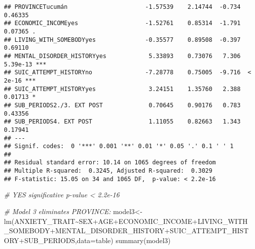 \documentclass[
]{book}
\newenvironment{Shaded}{\begin{snugshade}}{\end{snugshade}}
\newcommand{\AttributeTok}[1]{\textcolor[rgb]{0.77,0.63,0.00}{#1}}
\newcommand{\CommentTok}[1]{\textcolor[rgb]{0.56,0.35,0.01}{\textit{#1}}}
\newcommand{\FunctionTok}[1]{\textcolor[rgb]{0.00,0.00,0.00}{#1}}
\newcommand{\NormalTok}[1]{#1}
\newcommand{\OtherTok}[1]{\textcolor[rgb]{0.56,0.35,0.01}{#1}}
\newcommand{\SpecialCharTok}[1]{\textcolor[rgb]{0.00,0.00,0.00}{#1}}
\begin{document}
\begin{verbatim}
## PROVINCETucumán                      -1.57539    2.14744  -0.734  0.46335    
## ECONOMIC_INCOMEyes                   -1.52761    0.85314  -1.791  0.07365 .  
## LIVING_WITH_SOMEBODYyes              -0.35577    0.89508  -0.397  0.69110    
## MENTAL_DISORDER_HISTORYyes            5.33893    0.73076   7.306 5.39e-13 ***
## SUIC_ATTEMPT_HISTORYno               -7.28778    0.75005  -9.716  < 2e-16 ***
## SUIC_ATTEMPT_HISTORYyes               3.24151    1.35760   2.388  0.01713 *  
## SUB_PERIODS2./3. EXT POST             0.70645    0.90176   0.783  0.43356    
## SUB_PERIODS4. EXT POST                1.11055    0.82663   1.343  0.17941    
## ---
## Signif. codes:  0 '***' 0.001 '**' 0.01 '*' 0.05 '.' 0.1 ' ' 1
## 
## Residual standard error: 10.14 on 1065 degrees of freedom
## Multiple R-squared:  0.3245, Adjusted R-squared:  0.3029 
## F-statistic: 15.05 on 34 and 1065 DF,  p-value: < 2.2e-16
\end{verbatim}

\begin{Shaded}
\begin{Highlighting}[]
\CommentTok{\# YES significative p{-}value \textless{} 2.2e{-}16}

\CommentTok{\# Model 3 eliminates PROVINCE:}
\NormalTok{model3}\OtherTok{\textless{}{-}}\FunctionTok{lm}\NormalTok{(ANXIETY\_TRAIT}\SpecialCharTok{\textasciitilde{}}\NormalTok{SEX}\SpecialCharTok{+}\NormalTok{AGE}\SpecialCharTok{+}\NormalTok{ECONOMIC\_INCOME}\SpecialCharTok{+}\NormalTok{LIVING\_WITH\_SOMEBODY}\SpecialCharTok{+}\NormalTok{MENTAL\_DISORDER\_HISTORY}\SpecialCharTok{+}\NormalTok{SUIC\_ATTEMPT\_HISTORY}\SpecialCharTok{+}\NormalTok{SUB\_PERIODS,}\AttributeTok{data=}\NormalTok{table)}
\FunctionTok{summary}\NormalTok{(model3)}
\end{Highlighting}
\end{Shaded}
\end{document}
